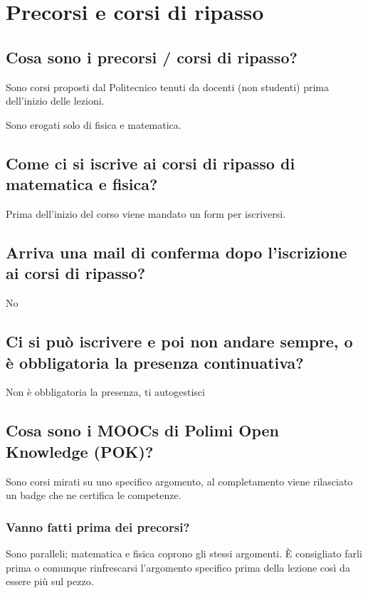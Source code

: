 \documentclass[legal]{polinetwork}
\begin{document}
\section{Precorsi e corsi di ripasso}


\subsection{Cosa sono i precorsi / corsi di ripasso?}


Sono corsi proposti dal Politecnico tenuti da docenti (non studenti) prima dell’inizio delle lezioni.

Sono erogati solo di fisica e matematica.

\subsection{Come ci si iscrive ai corsi di ripasso di matematica e fisica?}


Prima dell’inizio del corso viene mandato un form per iscriversi.

\subsection{Arriva una mail di conferma dopo l'iscrizione ai corsi di ripasso?}


No

\subsection{Ci si può iscrivere e poi non andare sempre, o è obbligatoria la presenza continuativa?}


Non è obbligatoria la presenza, ti autogestisci

\subsection{Cosa sono i MOOCs di Polimi Open Knowledge (POK)?}


Sono corsi mirati su uno specifico argomento, al completamento viene rilasciato un badge che ne certifica le competenze.

\subsubsection{Vanno fatti prima dei precorsi?}


Sono paralleli; matematica e fisica coprono gli stessi argomenti.
È consigliato farli prima o comunque rinfrescarsi l’argomento specifico prima della lezione così da essere più sul pezzo.
\end{document}
